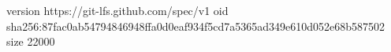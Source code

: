 version https://git-lfs.github.com/spec/v1
oid sha256:87fac0ab54794846948ffa0d0eaf934f5cd7a5365ad349e610d052e68b587502
size 22000
